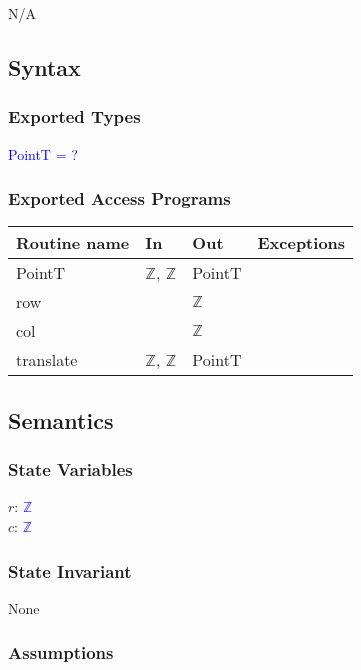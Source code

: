 \documentclass[12pt]{article}
\begin{document}
N/A

\subsection* {Syntax}

\subsubsection* {Exported Types}

\textcolor{blue}{PointT = ?}

\subsubsection* {Exported Access Programs}

\begin{tabular}{| l | l | l | l |}
\hline
\textbf{Routine name} & \textbf{In} & \textbf{Out} & \textbf{Exceptions}\\
\hline
PointT & $\mathbb{Z}$, $\mathbb{Z}$ & PointT & \\
\hline
row & ~ & $\mathbb{Z}$ & ~\\
\hline
col & ~ & $\mathbb{Z}$ & ~\\
\hline
translate & $\mathbb{Z}$, $\mathbb{Z}$ & PointT & ~\\
\hline
\end{tabular}

\subsection* {Semantics}

\subsubsection* {State Variables}

$r$: \textcolor{blue}{$\mathbb{Z}$}\\
$c$: \textcolor{blue}{$\mathbb{Z}$}\\

\subsubsection* {State Invariant}

None

\subsubsection* {Assumptions}
\end{document}
